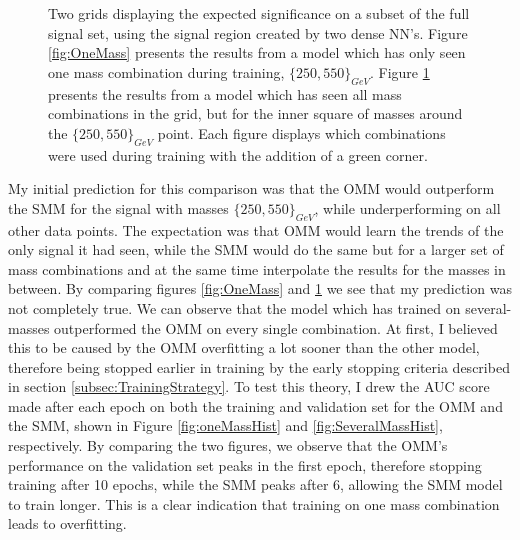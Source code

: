 \begin{figure}
{\begin{subfigure}{.6\textwidth}
        \vspace{-1.cm}
        \caption{}
        \label{fig:SeveralMass}
    \end{subfigure}
    }
    \caption[Two grids displaying the expected significance on a subset of the full signal set, using the signal region 
    created by two dense \acs{NN}'s, each training on different amounts of signal.]{Two grids displaying the expected significance 
    on a subset of the full signal set, using the signal region created by two dense \ac{NN}'s. Figure \ref{fig:OneMass} presents the results 
    from a model which has only seen one mass combination during training, $\{250,550\}_{GeV}$. Figure 
    \ref{fig:SeveralMass} presents the results from a model which has seen all mass combinations in the grid, but for the inner square of masses
    around the $\{250,550\}_{GeV}$ point. Each figure displays which combinations were used during training with the addition of a green corner.}
    \label{fig:Interpolation}
\end{figure}
My initial prediction for this comparison was that the \ac{OMM} would outperform the \ac{SMM} for the signal with masses
$\{250,550\}_{GeV}$, while underperforming on all other data points. The expectation was that \ac{OMM} 
would learn the trends of the only signal it had seen, while the \ac{SMM} would do the same but for a larger set of mass combinations and 
at the same time interpolate the results for the masses in between. By comparing figures \ref{fig:OneMass} and \ref{fig:SeveralMass} we 
see that my prediction was not completely true. We can observe that the model which has trained on several-masses outperformed the 
\ac{OMM} on every single combination. At first, I believed this to be caused by the \ac{OMM} overfitting a lot sooner than the other 
model, therefore being stopped earlier in training by the early stopping criteria described in section \ref{subsec:TrainingStrategy}. 
To test this theory, I drew the \ac{AUC} score made after each epoch on both the training and validation set for the \ac{OMM} and the 
\ac{SMM}, shown in Figure \ref{fig:oneMassHist} and \ref{fig:SeveralMassHist}, respectively. By comparing the two figures,
we observe that the \ac{OMM}'s performance on the validation set peaks in the first epoch, therefore stopping training after 
10 epochs, while the \ac{SMM} peaks after 6, allowing the \ac{SMM} model to train longer. This is a clear indication that training on 
one mass combination leads to overfitting. 
